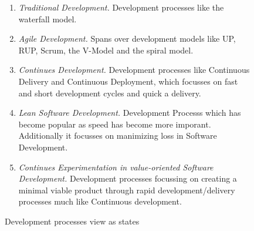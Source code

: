 \documentclass{sig-alternate}
\begin{document}
\begin{figure}
\caption{Development processes view as states}
\begin{enumerate}
\item \textit{Traditional Development.} Development processes like the waterfall model.
\item \textit{Agile Development.} Spans over development models like UP, RUP, Scrum, the V-Model and the spiral model.
\item \textit{Continues Development.} Development processes like Continuous Delivery and Continuous Deployment, which focusses on fast and short development cycles and quick a delivery.
\item \textit{Lean Software Development.} Development Processs which has become popular as speed has become more imporant. Additionally it focusses on manimizing loss in Software Development.
\item \textit{Continues Experimentation in value-oriented Software Development.} Development processes focussing on creating a minimal viable product through rapid development/delivery processes much like Continuous development.
\end{enumerate}
\label{fig:states}
\end{figure}
\end{document}

